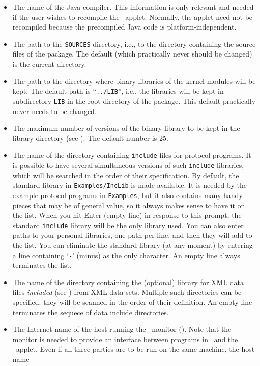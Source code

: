 \begin{itemize}
\item
The name of the Java compiler.
This information is only relevant and needed if the user
wishes to recompile the \dsd\ applet.
Normally, the applet need not be recompiled because the precompiled Java code
is platform-independent.
\item
The path to the {\tt SOURCES} directory, i.e., to the directory containing
the source files of the package.
The default (which practically never should be changed)
is the current directory.
\item
The path to the directory where binary libraries of the kernel modules
will be kept.
The default path is ``{\tt ../LIB}'', i.e., the libraries will be kept in
subdirectory {\tt LIB} in the root directory of the package.
This default practically never needs to be changed.
\item
The maximum number of versions of the binary library to be kept in the
library directory (see ).
The default number is 25.
\item
The name of the directory containing {\tt include} files for protocol programs.
It is possible to have several simultaneous versions of such {\tt include}
libraries, which will be searched in the order of their specification.
By default, the standard library in {\tt Examples/IncLib} is made available.
It is needed by the example protocol programs in {\tt Examples}, but it also
contains many handy pieces that may be of general value, so it always makes
sense to have it on the list.
When you hit Enter (empty line) in response to this prompt, the standard
{\tt include} library will be the only library used.
You can also enter paths to your personal libraries, one path per line, and
then they will add to the list.
You can eliminate the standard library (at any moment) by entering a line
containing `{\tt -}' (minus) as the only character.
An empty line always terminates the list.
\item
The name of the directory containing the (optional)
library for XML data files
{\em included\/} (see ) from XML data sets.
Multiple such directories can be specified: they will be
scanned in the order of their definition.
An empty line terminates the sequece of data include directories.
\item
The Internet
name of the host running the \smurph\ monitor ().
Note that the monitor is needed to provide an interface between programs
in \smurph\ and the \dsd\ applet.
Even if all three parties are to be run on the same machine, the host name

\end{itemize}
